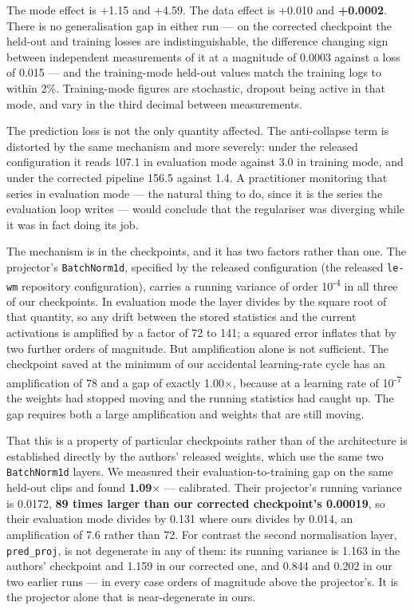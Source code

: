 \documentclass[10pt]{article}
\begin{document}
The mode effect is +1.15 and +4.59. The data effect is +0.010 and \textbf{+0.0002}.
There is no generalisation gap in either run --- on the corrected checkpoint the
held-out and training losses are indistinguishable, the difference changing
sign between independent measurements of it at a magnitude of 0.0003 against a
loss of 0.015 --- and the training-mode held-out values match the training logs
to within 2\%. Training-mode figures are stochastic, dropout being active in
that mode, and vary in the third decimal between measurements.

The prediction loss is not the only quantity affected. The anti-collapse term is
distorted by the same mechanism and more severely: under the released
configuration it reads 107.1 in evaluation mode against 3.0 in training mode,
and under the corrected pipeline 156.5 against 1.4. A practitioner monitoring
that series in evaluation mode --- the natural thing to do, since it is the series
the evaluation loop writes --- would conclude that the regulariser was diverging
while it was in fact doing its job.

The mechanism is in the checkpoints, and it has two factors rather than one.
The projector's \texttt{BatchNorm1d}, specified by the released configuration
(the released \texttt{le-wm} repository configuration), carries a running variance of order 10\textsuperscript{-4} in all three of our
checkpoints. In evaluation mode the layer divides by the square root of that
quantity, so any drift between the stored statistics and the current activations
is amplified by a factor of 72 to 141; a squared error inflates that by two
further orders of magnitude. But amplification alone is not sufficient. The
checkpoint saved at the minimum of our accidental learning-rate cycle has an
amplification of 78 and a gap of exactly 1.00$\times$, because at a learning rate of
10\textsuperscript{-7} the weights had stopped moving and the running statistics had caught up.
The gap requires both a large amplification and weights that are still moving.

That this is a property of particular checkpoints rather than of the
architecture is established directly by the authors' released weights, which use
the same two \texttt{BatchNorm1d} layers. We measured their evaluation-to-training gap
on the same held-out clips and found \textbf{1.09$\times$} --- calibrated. Their projector's
running variance is 0.0172, \textbf{89 times larger than our corrected checkpoint's
0.00019}, so their evaluation mode divides by 0.131 where ours divides by
0.014, an amplification of 7.6 rather than 72. For contrast the second normalisation layer, \texttt{pred\_proj}, is not degenerate in
any of them: its running variance is 1.163 in the authors' checkpoint and 1.159
in our corrected one, and 0.844 and 0.202 in our two earlier runs --- in every
case orders of magnitude above the projector's. It is the projector alone that is near-degenerate in
ours.
\end{document}
